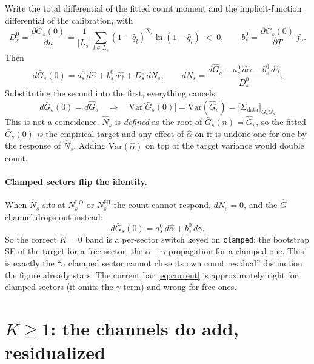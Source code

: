 \documentclass[11pt]{article}
\newcommand{\Gbar}{\bar{G}}
\newcommand{\Ghat}{\hat{G}}
\newcommand{\ahat}{\hat{\alpha}}
\newcommand{\ghat}{\hat{\gamma}}
\newcommand{\Nhat}{\hat{N}}
\newcommand{\qhat}{\hat{q}}
\begin{document}
Write the total differential of the fitted count moment and the implicit-function
differential of the calibration, with
\begin{equation}
D_s^{0}=\frac{\partial \Gbar_s(0)}{\partial n}
       =\frac{1}{|L_s|}\sum_{l\in L_s}(1-\qhat_l)^{\Nhat_s}\ln(1-\qhat_l)\;<\;0 ,
\qquad
b_s^{0}=\frac{\partial \Gbar_s(0)}{\partial T}\,f_\gamma .
\end{equation}
Then
\begin{equation}
d\Gbar_s(0)=a_s^{0}\,d\ahat+b_s^{0}\,d\ghat+D_s^{0}\,dN_s,
\qquad
dN_s=\frac{d\Ghat_s-a_s^{0}\,d\ahat-b_s^{0}\,d\ghat}{D_s^{0}} .
\label{eq:ift}
\end{equation}
Substituting the second into the first, everything cancels:
\begin{equation}
\boxed{\;d\Gbar_s(0)=d\Ghat_s
\quad\Longrightarrow\quad
\mathrm{Var}\big[\Gbar_s(0)\big]=\mathrm{Var}(\Ghat_s)=\big[\Sigma_{\mathrm{data}}\big]_{G_s G_s}\; }
\end{equation}
This is not a coincidence. $\Nhat_s$ is \emph{defined} as the root of
$\Gbar_s(n)=\Ghat_s$, so the fitted $\Gbar_s(0)$ \emph{is} the empirical target and any
effect of $\ahat$ on it is undone one-for-one by the response of $\Nhat_s$. Adding
$\mathrm{Var}(\ahat)$ on top of the target variance would double count.

\paragraph{Clamped sectors flip the identity.}
When $\Nhat_s$ sits at $N^{\mathrm{LO}}_s$ or $N^{\mathrm{HI}}_s$ the count cannot respond,
$dN_s=0$, and the $\Ghat$ channel drops out instead:
\begin{equation}
d\Gbar_s(0)=a_s^{0}\,d\ahat+b_s^{0}\,d\ghat .
\end{equation}
So the correct $K=0$ band is a per-sector switch keyed on \texttt{clamped}: the bootstrap SE
of the target for a free sector, the $\alpha+\gamma$ propagation for a clamped one. This is
exactly the ``a clamped sector cannot close its own count residual'' distinction the figure
already stars. The current bar \eqref{eq:current} is approximately right for clamped sectors
(it omits the $\gamma$ term) and wrong for free ones.

\section{$K\ge 1$: the channels do add, residualized}
\end{document}
